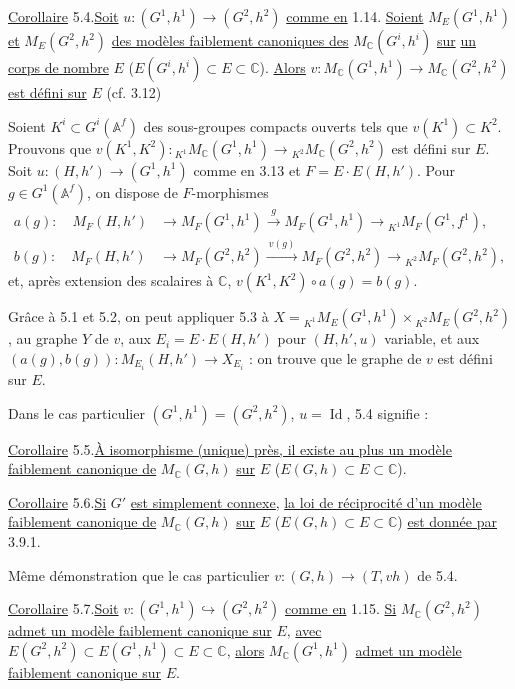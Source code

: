 \documentclass[10pt]{article}
\newcommand{\Af}{\mathbb A^f}
\newcommand{\C}{\mathbb C}
\newcommand{\MC}{M_{\C}}
\newcommand{\Id}{\operatorname{Id}}
\begin{document}
\noindent \uline{Corollaire} 5.4.\quad \uline{Soit} $u:(G^1,h^1)\longrightarrow(G^2,h^2)$ \uline{comme en} 1.14. \uline{Soient} $M_E(G^1,h^1)$ \uline{et} $M_E(G^2,h^2)$ \uline{des modèles faiblement canoniques des} $\MC(G^i,h^i)$ \uline{sur} \uline{un corps de nombre} $E$ ($E(G^i,h^i)\subset E\subset\C$). \uline{Alors} $v:\MC(G^1,h^1)\longrightarrow\MC(G^2,h^2)$ \uline{est défini sur} $E$ (cf. 3.12)

Soient $K^i\subset G^i(\Af)$ des sous-groupes compacts ouverts tels que $v(K^1)\subset K^2$. Prouvons que $v(K^1,K^2):{}_{K^1}\MC(G^1,h^1)\longrightarrow{}_{K^2}\MC(G^2,h^2)$ est défini sur $E$. Soit $u:(H,h')\to(G^1,h^1)$ comme en 3.13 et $F=E\cdot E(H,h')$. Pour $g\in G^1(\Af)$, on dispose de $F$-morphismes
\[
\begin{aligned}
a(g):\quad M_F(H,h')&\longrightarrow M_F(G^1,h^1)
 \xrightarrow{\ g\ } M_F(G^1,h^1)
 \longrightarrow {}_{K^1}M_F(G^1,f^1),\\
b(g):\quad M_F(H,h')&\longrightarrow M_F(G^2,h^2)
 \xrightarrow{\ v(g)\ } M_F(G^2,h^2)
 \longrightarrow {}_{K^2}M_F(G^2,h^2),
\end{aligned}
\]
et, après extension des scalaires à $\C$, $v(K^1,K^2)\circ a(g)=b(g)$.

Grâce à 5.1 et 5.2, on peut appliquer 5.3 à $X={}_{K^1}M_E(G^1,h^1)\times{}_{K^2}M_E(G^2,h^2)$, au graphe $Y$ de $v$, aux $E_i=E\cdot E(H,h')$ pour $(H,h',u)$ variable, et aux $(a(g),b(g)):M_{E_i}(H,h')\longrightarrow X_{E_i}$ : on trouve que le graphe de $v$ est défini sur $E$.

Dans le cas particulier $(G^1,h^1)=(G^2,h^2)$, $u=\Id$, 5.4 signifie :

\noindent \uline{Corollaire} 5.5.\quad \uline{À isomorphisme (unique) près, il existe au plus un modèle faiblement canonique de} $\MC(G,h)$ \uline{sur} $E$ ($E(G,h)\subset E\subset\C$).

\noindent \uline{Corollaire} 5.6.\quad \uline{Si} $G'$ \uline{est simplement connexe,} \uline{la loi de réciprocité d'un modèle faiblement canonique de} $\MC(G,h)$ \uline{sur} $E$ ($E(G,h)\subset E\subset\C$) \uline{est donnée par} 3.9.1.

Même démonstration que le cas particulier $v:(G,h)\to(T,vh)$ de 5.4.

\noindent \uline{Corollaire} 5.7.\quad \uline{Soit} $v:(G^1,h^1)\hookrightarrow(G^2,h^2)$ \uline{comme en} 1.15. \uline{Si} $\MC(G^2,h^2)$ \uline{admet un modèle faiblement canonique sur} $E$, \uline{avec} $E(G^2,h^2)\subset E(G^1,h^1)\subset E\subset\C$, \uline{alors} $\MC(G^1,h^1)$ \uline{admet un modèle faiblement canonique sur} $E$.
\end{document}
